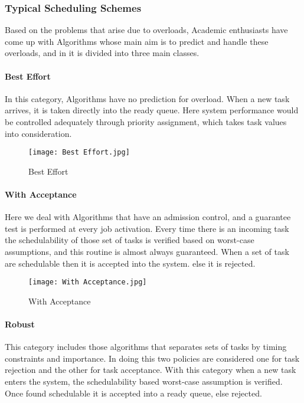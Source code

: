 \documentclass[conference]{IEEEtran}
\begin{document}
\subsubsection{Typical Scheduling Schemes}
Based on the problems that arise due to overloads, Academic enthusiasts have come up with Algorithms whose main aim is to predict and handle these overloads, and in \cite{buttazzo2011hard} it is divided into three main classes.
\paragraph{Best Effort}
In this category, Algorithms have no prediction for overload. When a new task arrives, it is taken directly into the ready queue. Here system performance would be controlled adequately through priority assignment, which takes task values into consideration.

\begin{figure}[htp]
    \centering
    \texttt{[image: Best Effort.jpg]}
    \caption{Best Effort{\cite{buttazzo2011hard}}}
    \label{fig:reg-gen}
\end{figure}
\paragraph{With Acceptance}
Here we deal with Algorithms that have an admission control, and a guarantee test is performed at every job activation. Every time there is an incoming task the schedulability of those set of tasks is verified based on worst-case assumptions, and this routine is almost always guaranteed. When a set of task are schedulable then it is accepted into the system. else it is rejected.

\begin{figure}[htp]
    \centering
    \texttt{[image: With Acceptance.jpg]}
    \caption{With Acceptance{\cite{buttazzo2011hard}}}
    \label{fig:reg-gen}
\end{figure}

\paragraph{Robust}
This category includes those algorithms that separates sets of tasks by timing constraints and importance. In doing this two policies are considered one for task rejection and the other for task acceptance. With this category when a new task enters the system, the schedulability based worst-case assumption is verified. Once found schedulable it is accepted into a ready queue, else rejected.
\end{document}

